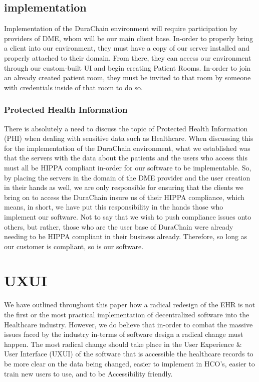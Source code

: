 \documentclass[letterpaper]{article}
\begin{document}
\subsection{implementation}
Implementation of the DuraChain environment will require participation by providers of DME, whom will be our main client base. In-order to properly bring a client into our environment, they must have a copy of our server installed and properly attached to their domain. From there, they can access our environment through our custom-built UI and begin creating Patient Rooms. In-order to join an already created patient room, they must be invited to that room by someone with credentials inside of that room to do so.
%
\subsubsection{Protected Health Information}
There is absolutely a need to discuss the topic of Protected Health Information (PHI) when dealing with sensitive data such as Healthcare. When discussing this for the implementation of the DuraChain environment, what we established was that the servers with the data about the patients and the users who access this must all be HIPPA compliant in-order for our software to be implementable. So, by placing the servers in the domain of the DME provider and the user creation in their hands as well, we are only responsible for ensuring that the clients we bring on to access the DuraChain insure us of their HIPPA compliance, which means, in short, we have put this responsibility in the hands those who implement our software. Not to say that we wish to push compliance issues onto others, but rather, those who are the user base of DuraChain were already needing to be HIPPA compliant in their business already. Therefore, so long as our customer is compliant, so is our software.
%
\section{UXUI}
We have outlined throughout this paper how a radical redesign of the EHR is not the first or the most practical implementation of decentralized software into the Healthcare industry. However, we do believe that in-order to combat the massive issues faced by the industry in-terms of software design a radical change must happen. The most radical change should take place in the User Experience & User Interface (UXUI) of the software that is accessible the healthcare records to be more clear on the data being changed, easier to implement in HCO’s, easier to train new users to use, and to be Accessibility friendly.
%
\end{document}
